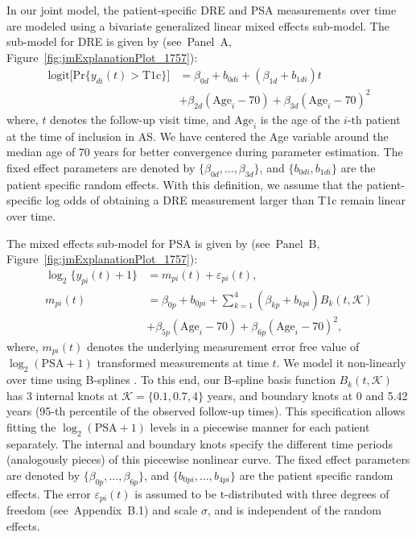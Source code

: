 In our joint model, the patient-specific DRE and PSA measurements over time are modeled using a bivariate generalized linear mixed effects sub-model. The sub-model for DRE is given by (see~Panel~A, Figure~\ref{fig:jmExplanationPlot_1757}):
\begin{equation}
\label{eq:long_model_dre}
\begin{split}
    \mbox{logit} \big[\mbox{Pr}\{y_{di}(t) > \mbox{T1c}\}\big] &= \beta_{0d} + b_{0di} + (\beta_{1d} + b_{1di}) t\\
    &+ \beta_{2d} (\mbox{Age}_i-70) + \beta_{3d} (\mbox{Age}_i-70)^2
    \end{split}
\end{equation}
where, $t$ denotes the follow-up visit time, and $\mbox{Age}_i$ is the age of the ${i\mbox{-th}}$ patient at the time of inclusion in AS. We have centered the Age variable around the median age of 70 years for better convergence during parameter estimation. The fixed effect parameters are denoted by ${\{\beta_{0d}, \ldots, \beta_{3d}\}}$, and ${\{b_{0di}, b_{1di}\}}$ are the patient specific random effects. With this definition, we assume that the patient-specific log odds of obtaining a DRE measurement larger than T1c remain linear over time. 

The mixed effects sub-model for PSA is given by (see~Panel~B, Figure~\ref{fig:jmExplanationPlot_1757}):
\begin{equation}
\label{eq:long_model_psa}
\begin{split}
    \log_2 \big\{y_{pi}(t) + 1\big\} &= m_{pi}(t) + \varepsilon_{pi}(t),\\
    m_{pi}(t) &= \beta_{0p} + b_{0pi} + \sum_{k=1}^4 (\beta_{kp} + b_{kpi})  B_k(t,\mathcal{K})\\ 
    &+ \beta_{5p} (\mbox{Age}_i-70) + \beta_{6p} (\mbox{Age}_i-70)^2,
    \end{split}
\end{equation}
where, $m_{pi}(t)$ denotes the underlying measurement error free value of $\log_2 (\mbox{PSA} + 1)$ transformed \citep{pearson1994mixed,lin2000latent} measurements at time $t$. We model it non-linearly over time using B-splines \citep{de1978practical}. To this end, our B-spline basis function $B_k(t, \mathcal{K})$ has 3 internal knots at $\mathcal{K} = \{0.1, 0.7, 4\}$ years, and boundary knots at 0 and 5.42 years (95-th percentile of the observed follow-up times). This specification allows fitting the $\log_2 (\mbox{PSA} + 1)$ levels in a piecewise manner for each patient separately. The internal and boundary knots specify the different time periods (analogously pieces) of this piecewise nonlinear curve. The fixed effect parameters are denoted by ${\{\beta_{0p},\ldots,\beta_{6p}\}}$, and ${\{b_{0pi}, \ldots, b_{4pi}\}}$ are the patient specific random effects. The error $\varepsilon_{pi}(t)$ is assumed to be t-distributed with three degrees of freedom (see~Appendix~B.1) and scale $\sigma$, and is independent of the random effects. 

